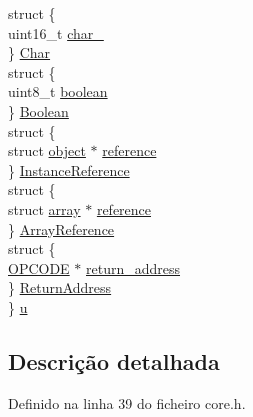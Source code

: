 \begin{DoxyCompactItemize}
\begin{tabbing}
\>struct \{\\
\>\>uint16\_t \hyperlink{structvalue_aabf3d6c1e51cee9d6bec48077f36d1c4}{char\_}\\
\>\} \hyperlink{structvalue_a730511b073f9ef902b73f72b08f97ad4}{Char}\\
\>struct \{\\
\>\>uint8\_t \hyperlink{structvalue_accc539dfc5234b1ff83f084dfeedab4e}{boolean}\\
\>\} \hyperlink{structvalue_a3daafd6e88c6428a0be01e1a4002eb96}{Boolean}\\
\>struct \{\\
\>\>struct \hyperlink{structobject}{object} $\ast$ \hyperlink{structvalue_ab277933041ff972104180fda5190a425}{reference}\\
\>\} \hyperlink{structvalue_acfcc12390036cb37f60fa22e0900ef8d}{InstanceReference}\\
\>struct \{\\
\>\>struct \hyperlink{structarray}{array} $\ast$ \hyperlink{structvalue_a97a92c9e274a9166f7ae32164a06fe1d}{reference}\\
\>\} \hyperlink{structvalue_a09d361f523397d57aa1589c63fddb429}{ArrayReference}\\
\>struct \{\\
\>\>\hyperlink{core_8h_ab34056db44556fbb28ffa6aff4873b4c}{OPCODE} $\ast$ \hyperlink{structvalue_ae154453352d31839cbe33fca89fc98aa}{return\_address}\\
\>\} \hyperlink{structvalue_a264ea0eb8eca9c9698c66c7412e8ca88}{ReturnAddress}\\
\} \hyperlink{structvalue_acee60f59572f5488da8ac5748e80e9cc}{u}\\

\end{tabbing}\end{DoxyCompactItemize}


\subsection{Descrição detalhada}


Definido na linha 39 do ficheiro core.\-h.



